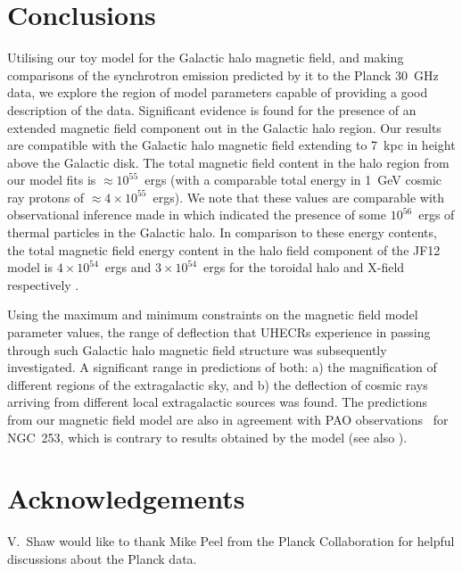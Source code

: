 \documentclass[usenatbib]{mnras}
\begin{document}
\section{Conclusions}
\label{Conclusions}

Utilising our toy model for the Galactic halo magnetic field, and making comparisons of the synchrotron emission predicted by it to the Planck 30~GHz data, we explore the region of model parameters capable of providing a good description of the data. Significant evidence is found for the presence of an extended magnetic field component out in the Galactic halo region. Our results are compatible with the Galactic halo magnetic field extending to 7~kpc in height above the Galactic disk. The total magnetic field content in the halo region from our model fits is $\approx 10^{55}$~ergs (with a comparable total energy in 1~GeV cosmic ray protons of $\approx 4\times 10^{55}$~ergs). We note that these values are comparable with observational inference made in \cite{eROSITA} which indicated the presence of some $10^{56}$~ergs of thermal particles in the Galactic halo.
In comparison to these energy contents, the total magnetic field energy content in the halo field component of the JF12 model is $4\times 10^{54}$~ergs and $3\times  10^{54}$~ergs for the toroidal halo and X-field respectively \citep{Taylor_2019}.

Using the maximum and minimum constraints on the magnetic field model parameter values, the range of deflection that UHECRs experience in passing through such Galactic halo magnetic field structure was subsequently investigated. A significant range in predictions of both: a) the magnification of different regions of the extragalactic sky, and b) the deflection of cosmic rays arriving from different local extragalactic sources was found. The predictions from our magnetic field model are also in agreement with PAO observations~\citep{Auger_Starburst2018} for NGC~253, which is contrary to results obtained by the \citet{JF12} model (see also \citet{Arjen_2021}).


\section*{Acknowledgements}
V.~Shaw would like to thank Mike Peel from the Planck Collaboration for helpful discussions about the Planck data.




\appendix
\end{document}
